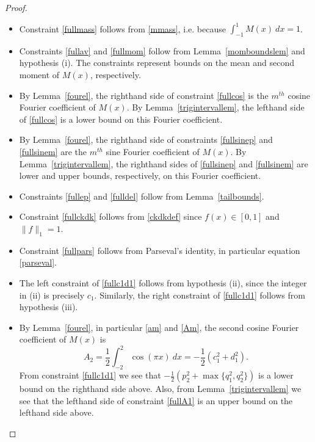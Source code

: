 \documentclass[12pt]{article}
\numberwithin{equation}{section}
\begin{document}
\begin{proof}
\begin{itemize}
\item Constraint \eqref{fullmass} follows from \eqref{mmass}, i.e. because $\int_{-1}^1 M(x) \ dx = 1$. 
\item Constraints \eqref{fullav} and \eqref{fullmom} follow from Lemma~\ref{momboundslem} and hypothesis (i). The constraints represent bounds on the mean and second moment of $M(x)$, respectively.
\item By Lemma~\ref{fourel}, the righthand side of constraint \eqref{fullcos} is the $m^{th}$ cosine Fourier coefficient of $M(x)$. By Lemma~\ref{trigintervallem}, the lefthand side of \eqref{fullcos} is a lower bound on this Fourier coefficient.
\item By Lemma~\ref{fourel}, the righthand side of constraints \eqref{fullsinep} and \eqref{fullsinem} are the $m^{th}$ sine Fourier coefficient of $M(x)$. By Lemma~\ref{trigintervallem}, the righthand sides of \eqref{fullsinep} and \eqref{fullsinem} are lower and upper bounds, respectively, on this Fourier coefficient.
\item Constraints \eqref{fullep} and \eqref{fulldel} follow from Lemma~\ref{tailbounds}.
\item Constraint \eqref{fullckdk} follows from \eqref{ckdkdef} since $f(x) \in [0,1]$ and $\|f\|_1 = 1$. 
\item Constraint \eqref{fullpars} follows from Parseval's identity, in particular equation \eqref{parseval}.
\item The left constraint of \eqref{fullc1d1} follows from hypothesis (ii), since the integer in (ii) is precisely $c_1$. Similarly, the right constraint of \eqref{fullc1d1} follows from hypothesis (iii).

\item By Lemma~\ref{fourel}, in particular \eqref{am} and \eqref{Am}, the second cosine Fourier coefficient of $M(x)$ is 
\[ A_2  = \frac{1}{2} \int_{-2}^2 \cos(\pi x) \ dx = -\frac{1}{2}(c_1^2+d_1^2).\]
From constraint \eqref{fullc1d1} we see that $-\frac{1}{2}(p_2^2+\max\{q_1^2,q_2^2\})$ is a lower bound on the righthand side above. Also, from Lemma~\ref{trigintervallem} we see that the lefthand side of constraint \eqref{fullA1} is an upper bound on the lefthand side above. 
\end{itemize}

\end{proof} 




\renewcommand{\arraystretch}{1.3}
\end{document}
